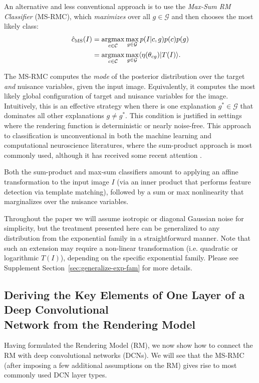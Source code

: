 \documentclass[12pt]{article}
\DeclareMathOperator*{\argmax}{argmax}
\newcommand{\Cl}[0]{{ \mathcal{C} }}
\newcommand{\G}[0]{{ \mathcal{G} }}
\begin{document}
An alternative and less conventional approach is to use the {\em Max-Sum RM Classifier} (MS-RMC), which \emph{maximizes} over all $g \in \G$ and then chooses the most likely class:
\begin{align} 
	\label{eqn:msc}
	\hat{c}_{\rm MS}(I) &= \argmax_{c \in \Cl}  \max_{g \in \G} p(I|c,g) p(c) p(g) \nonumber\\
	               &= \argmax_{c \in \Cl} \max_{g\in \G} \langle \eta(\theta_{cg}) | T(I) \rangle.
\end{align}

The MS-RMC computes the {\em mode} of the posterior distribution over the target \emph{and} nuisance variables, given the input image. Equivalently, it computes the most likely global configuration of target and nuisance variables for the image. 
Intuitively, this is an effective strategy when there is one explanation $g^* \in \G$ that dominates all other explanations $g \neq g^*$. 
This condition is justified in settings where the rendering function is deterministic or nearly noise-free. 
This approach to classification is unconventional in both the machine learning and computational neuroscience literatures, where the sum-product approach is most commonly used, although it has received some recent attention \cite{bengio2013representation}.
 
Both the sum-product and max-sum classifiers amount to applying an affine transformation to the input image $I$ (via an inner product that performs feature detection via template matching), followed by a sum or max nonlinearity that marginalizes over the nuisance variables. 

Throughout the paper we will assume isotropic or diagonal Gaussian noise for simplicity, but the treatment presented here can be generalized to any distribution from the exponential family in a straightforward manner. Note that such an extension may require a non-linear transformation (i.e. quadratic or logarithmic $T(I)$), depending on the specific exponential family. Please see Supplement Section~\ref{sec:generalize-exp-fam} for more details.

\subsection{Deriving the Key Elements of One Layer of a Deep Convolutional \\ Network from the Rendering Model}
\label{sec:shallowRMC}

Having formulated the Rendering Model (RM), we now show how to connect the RM with deep convolutional networks (DCNs). 
We will see that the MS-RMC (after imposing a few additional assumptions on the RM) gives rise to most commonly used DCN layer types. 
\end{document}
